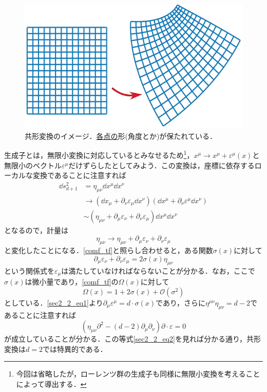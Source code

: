 \documentclass[a4paper,uplatex,dvipdfmx]{jsarticle}
\theoremstyle{definition}
\begin{document}
\begin{figure}[ht]
  \centering
  \includegraphics[keepaspectratio,width=0.8\linewidth]{fig/cft_img.png}
  \caption{共形変換のイメージ．\underline{各点の}形(角度とか)が保たれている．}
  \label{cft_img}
\end{figure}

生成子とは，無限小変換に対応しているとみなせるため\footnote{
  今回は省略したが，ローレンツ群の生成子も同様に無限小変換を考えることによって導出する．
}，$x^{\mu}\rightarrow x^{\mu}+\varepsilon^{\mu}(x)$と無限小のベクトル$\varepsilon^{\mu}$だけずらしたとしてみよう．この変換は，座標に依存するローカルな変換であることに注意すれば
\begin{align}
  \dd s_{d+1}^2
  &=
  \eta_{\mu\nu}
  \dd x^{\mu}\dd x^{\nu}
  \nonumber
  \\
  &\rightarrow
  (\dd x_{\mu}+\partial_{\nu}\varepsilon_{\mu}\dd x^{\nu})
  (\dd x^{\mu}+\partial_{\nu}\varepsilon^{\mu}\dd x^{\nu})
  \nonumber
  \\
  &\sim
  \left( \eta_{\mu\nu}+\partial_{\mu}\varepsilon_{\nu}+\partial_{\nu}\varepsilon_{\mu} \right)
  \dd x^{\mu}\dd x^{\nu}
\end{align}
となるので，計量は
\begin{equation}
  \eta_{\mu\nu}
  \rightarrow
  \eta_{\mu\nu}
  +
  \partial_{\mu}\varepsilon_{\nu}+\partial_{\nu}\varepsilon_{\mu}
\end{equation}
と変化したことになる．\eqref{comf_tf}と照らし合わせると，ある関数$\sigma(x)$に対して
\begin{equation}
  \partial_{\mu}\varepsilon_{\nu}+\partial_{\nu}\varepsilon_{\mu}
  =
  2\sigma(x)\eta_{\mu\nu}  
  \label{sec2_2_eq1}
\end{equation}
という関係式を$\varepsilon_{\mu}$は満たしていなければならないことが分かる．なお，ここで$\sigma(x)$は微小量であり，\eqref{comf_tf}の$\Omega(x)$に対して
\begin{equation}
  \Omega(x)
  =
  1+2\sigma(x)+\mathcal{O}(\sigma^2)
\end{equation}
としている．\eqref{sec2_2_eq1}より$\partial_{\mu}\varepsilon^{\mu}=d\cdot \sigma(x)$であり，さらに$\eta^{\mu\nu}\eta_{\mu\nu}=d-2$であることに注意すれば
\begin{equation}
  (\eta_{\mu\nu}\partial^{2}-(d-2)\partial_{\mu}\partial_{\nu})\partial\cdot\varepsilon
  =
  0
  \label{sec2_2_eq2}
\end{equation}
が成立していることが分かる．この等式\eqref{sec2_2_eq2}を見れば分かる通り，共形変換は$d=2$では特異的である．
\end{document}
